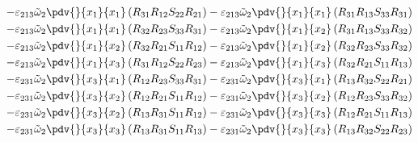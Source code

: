 \begin{equation}
	\begin{split}
		-\varepsilon_{213}\tilde{\omega}_{2}\pdv{}{x_{1}}{x_{1}}\left(R_{31}R_{12}S_{22}R_{21}\right)		-\varepsilon_{213}\tilde{\omega}_{2}\pdv{}{x_{1}}{x_{1}}\left(R_{31}R_{13}S_{33}R_{31}\right)\\
		-\varepsilon_{213}\tilde{\omega}_{2}\pdv{}{x_{1}}{x_{1}}\left(R_{32}R_{23}S_{33}R_{31}\right)		-\varepsilon_{213}\tilde{\omega}_{2}\pdv{}{x_{1}}{x_{2}}\left(R_{31}R_{13}S_{33}R_{32}\right)\\
		-\varepsilon_{213}\tilde{\omega}_{2}\pdv{}{x_{1}}{x_{2}}\left(R_{32}R_{21}S_{11}R_{12}\right)		-\varepsilon_{213}\tilde{\omega}_{2}\pdv{}{x_{1}}{x_{2}}\left(R_{32}R_{23}S_{33}R_{32}\right)\\
		-\varepsilon_{213}\tilde{\omega}_{2}\pdv{}{x_{1}}{x_{3}}\left(R_{31}R_{12}S_{22}R_{23}\right)		-\varepsilon_{213}\tilde{\omega}_{2}\pdv{}{x_{1}}{x_{3}}\left(R_{32}R_{21}S_{11}R_{13}\right)\\
		-\varepsilon_{231}\tilde{\omega}_{2}\pdv{}{x_{3}}{x_{1}}\left(R_{12}R_{23}S_{33}R_{31}\right)		-\varepsilon_{231}\tilde{\omega}_{2}\pdv{}{x_{3}}{x_{1}}\left(R_{13}R_{32}S_{22}R_{21}\right)\\
		-\varepsilon_{231}\tilde{\omega}_{2}\pdv{}{x_{3}}{x_{2}}\left(R_{12}R_{21}S_{11}R_{12}\right)		-\varepsilon_{231}\tilde{\omega}_{2}\pdv{}{x_{3}}{x_{2}}\left(R_{12}R_{23}S_{33}R_{32}\right)\\
		-\varepsilon_{231}\tilde{\omega}_{2}\pdv{}{x_{3}}{x_{2}}\left(R_{13}R_{31}S_{11}R_{12}\right)		-\varepsilon_{231}\tilde{\omega}_{2}\pdv{}{x_{3}}{x_{3}}\left(R_{12}R_{21}S_{11}R_{13}\right)\\
		-\varepsilon_{231}\tilde{\omega}_{2}\pdv{}{x_{3}}{x_{3}}\left(R_{13}R_{31}S_{11}R_{13}\right)		-\varepsilon_{231}\tilde{\omega}_{2}\pdv{}{x_{3}}{x_{3}}\left(R_{13}R_{32}S_{22}R_{23}\right)\\
	\end{split}
\end{equation}
